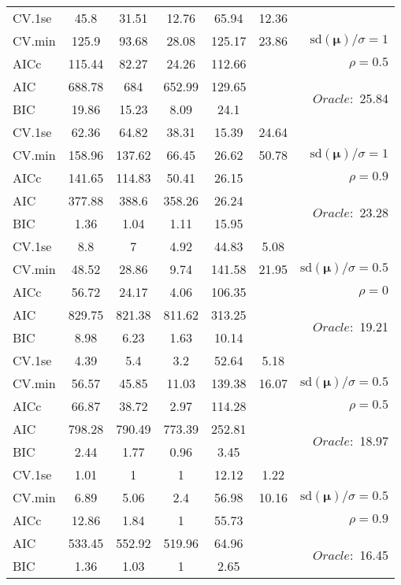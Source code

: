 \begin{table}
\begin{center}
\begin{tabular}{l*{5}{c}|r}
 \hline 
CV.1se & 45.8 & 31.51 & 12.76 & 65.94 & 12.36 & \\
CV.min & 125.9 & 93.68 & 28.08 & 125.17 & 23.86 &  $\mathrm{sd}(\mathbf{\mu})/\sigma=1$ \\
AICc & 115.44 & 82.27 & 24.26 & 112.66 & & $\rho=0.5$ \\
AIC & 688.78 & 684 & 652.99 & 129.65 & &  \multirow{2}{*}{$Oracle: $ 25.84} \\
BIC & 19.86 & 15.23 & 8.09 & 24.1 & &  \\
 \hline 
CV.1se & 62.36 & 64.82 & 38.31 & 15.39 & 24.64 & \\
CV.min & 158.96 & 137.62 & 66.45 & 26.62 & 50.78 &  $\mathrm{sd}(\mathbf{\mu})/\sigma=1$ \\
AICc & 141.65 & 114.83 & 50.41 & 26.15 & & $\rho=0.9$ \\
AIC & 377.88 & 388.6 & 358.26 & 26.24 & &  \multirow{2}{*}{$Oracle: $ 23.28} \\
BIC & 1.36 & 1.04 & 1.11 & 15.95 & &  \\
 \hline 
CV.1se & 8.8 & 7 & 4.92 & 44.83 & 5.08 & \\
CV.min & 48.52 & 28.86 & 9.74 & 141.58 & 21.95 &  $\mathrm{sd}(\mathbf{\mu})/\sigma=0.5$ \\
AICc & 56.72 & 24.17 & 4.06 & 106.35 & & $\rho=0$ \\
AIC & 829.75 & 821.38 & 811.62 & 313.25 & &  \multirow{2}{*}{$Oracle: $ 19.21} \\
BIC & 8.98 & 6.23 & 1.63 & 10.14 & &  \\
 \hline 
CV.1se & 4.39 & 5.4 & 3.2 & 52.64 & 5.18 & \\
CV.min & 56.57 & 45.85 & 11.03 & 139.38 & 16.07 &  $\mathrm{sd}(\mathbf{\mu})/\sigma=0.5$ \\
AICc & 66.87 & 38.72 & 2.97 & 114.28 & & $\rho=0.5$ \\
AIC & 798.28 & 790.49 & 773.39 & 252.81 & &  \multirow{2}{*}{$Oracle: $ 18.97} \\
BIC & 2.44 & 1.77 & 0.96 & 3.45 & &  \\
 \hline 
CV.1se & 1.01 & 1 & 1 & 12.12 & 1.22 & \\
CV.min & 6.89 & 5.06 & 2.4 & 56.98 & 10.16 &  $\mathrm{sd}(\mathbf{\mu})/\sigma=0.5$ \\
AICc & 12.86 & 1.84 & 1 & 55.73 & & $\rho=0.9$ \\
AIC & 533.45 & 552.92 & 519.96 & 64.96 & &  \multirow{2}{*}{$Oracle: $ 16.45} \\
BIC & 1.36 & 1.03 & 1 & 2.65 & &  \\
 \hline 
\end{tabular}
\end{center}
\vspace{-1cm}
\end{table}





